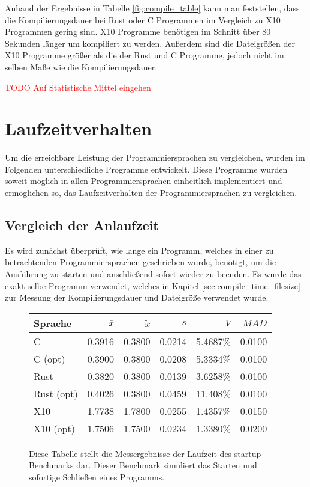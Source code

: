 Anhand der Ergebnisse in Tabelle \ref{fig:compile_table} kann man feststellen,
dass die Kompilierungsdauer bei Rust oder C Programmen im Vergleich zu
X10 Programmen gering sind. X10 Programme benötigen im Schnitt über 80 Sekunden länger um kompiliert zu werden.
Außerdem sind die Dateigrößen der X10 Programme größer als die der Rust und C Programme,
jedoch nicht im selben Maße wie die Kompilierungsdauer.

\textcolor{red}{TODO Auf Statistische Mittel eingehen}

\section{Laufzeitverhalten}

Um die erreichbare Leistung der Programmiersprachen zu vergleichen,
wurden im Folgenden unterschiedliche Programme entwickelt.
Diese Programme wurden soweit möglich in allen Programmiersprachen einheitlich implementiert und ermöglichen so,
das Laufzeitverhalten der Programmiersprachen zu vergleichen.

\subsection{Vergleich der Anlaufzeit}

Es wird zunächst überprüft, wie lange ein Programm,
welches in einer zu betrachtenden Programmiersprachen geschrieben wurde,
benötigt, um die Ausführung zu starten und anschließend sofort wieder zu beenden.
Es wurde das exakt selbe Programm verwendet, welches in Kapitel \ref{sec:compile_time_filesize} zur Messung
der Kompilierungsdauer und Dateigröße verwendet wurde.

\begin{figure}[hb]
	\begin{center}
		\begin{tabular}{lrrrrr}
			\toprule
			Sprache    & $\bar{x}$ & $\tilde{x}$ & $s$ & $V$ & $MAD$ \\
			\midrule
			C          & 0.3916 & 0.3800 & 0.0214 & 5.4687\% & 0.0100 \\
			C (opt)    & 0.3900 & 0.3800 & 0.0208 & 5.3334\% & 0.0100 \\
			Rust       & 0.3820 & 0.3800 & 0.0139 & 3.6258\% & 0.0100 \\
			Rust (opt) & 0.4026 & 0.3800 & 0.0459 & 11.408\% & 0.0100 \\
			X10        & 1.7738 & 1.7800 & 0.0255 & 1.4357\% & 0.0150 \\
			X10 (opt)  & 1.7506 & 1.7500 & 0.0234 & 1.3380\% & 0.0200 \\
			\bottomrule
		\end{tabular}
	\end{center}
	\caption{
		Diese Tabelle stellt die Messergebnisse der Laufzeit des startup-Benchmarks dar.
		Dieser Benchmark simuliert das Starten und sofortige Schließen eines Programms.
	}
	\label{fig:startup_table}
\end{figure}

